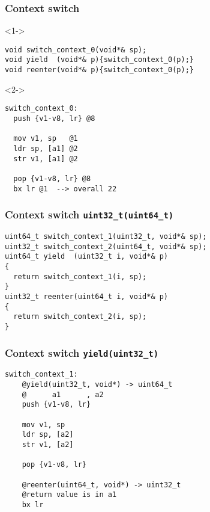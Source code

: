 \documentclass{beamer}
\begin{document}
\begin{frame}[fragile]
\frametitle{Context switch}
\vspace*{-2ex}
\begin{block}<1->{\vspace*{-3.2ex}}
\begin{lstlisting}
void switch_context_0(void*& sp);
void yield  (void*& p){switch_context_0(p);}
void reenter(void*& p){switch_context_0(p);}

\end{lstlisting}
\end{block}
\vspace*{-2ex}
\begin{block}<2->{\vspace*{-3.2ex}}
\begin{lstlisting}[language=ASM]
switch_context_0:
  push {v1-v8, lr} @8
  
  mov v1, sp   @1
  ldr sp, [a1] @2
  str v1, [a1] @2	

  pop {v1-v8, lr} @8
  bx lr @1  --> overall 22
\end{lstlisting}
\end{block}
\end{frame}

\begin{frame}[fragile]
\frametitle{Context switch \lstinline{uint32_t(uint64_t)}}
\begin{block}{\vspace*{-3.2ex}}
\begin{lstlisting}[basicstyle=\small]
uint64_t switch_context_1(uint32_t, void*& sp);
uint32_t switch_context_2(uint64_t, void*& sp);
uint64_t yield  (uint32_t i, void*& p)
{
  return switch_context_1(i, sp);
}
uint32_t reenter(uint64_t i, void*& p)
{
  return switch_context_2(i, sp);
}
\end{lstlisting}
\end{block}
\end{frame}

\begin{frame}[fragile]
\frametitle{Context switch \lstinline{yield(uint32_t)}}
\begin{block}{\vspace*{-3.2ex}}
\begin{lstlisting}[language=ASM, basicstyle=\small]
switch_context_1:
    @yield(uint32_t, void*) -> uint64_t
    @      a1      , a2
    push {v1-v8, lr} 

    mov v1, sp
    ldr sp, [a2]
    str v1, [a2]

    pop {v1-v8, lr}

    @reenter(uint64_t, void*) -> uint32_t
    @return value is in a1
    bx lr
\end{lstlisting}
\end{block}
\end{frame}
\end{document}
